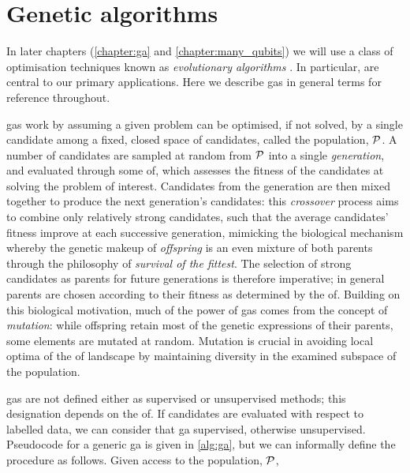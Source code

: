 \section{Genetic algorithms}\label{sec:genetic_algorithms}
In later chapters (\cref{chapter:ga} and \cref{chapter:many_qubits}) 
    we will use a class of optimisation techniques known as
    \emph{evolutionary algorithms} \cite{back1996evolutionary, de2020evolutionary}.
In particular, \emph{} are central to our primary applications.
Here we describe \glspl{ga} in general terms for reference throughout. 
\par 
\glspl{ga} work by assuming a given problem can be optimised, if not solved, by a single candidate 
    among a fixed, closed space of candidates, called the population, $\mathcal{P}$. 
A number of candidates are sampled at random from $\mathcal{P}$ into a single \emph{generation}, 
    and evaluated through some \acrfull{of}, which assesses the fitness of the candidates at solving the problem of interest. 
Candidates from the generation are then mixed together to produce the next generation's candidates: 
    this \emph{crossover} process aims to combine only relatively strong candidates, such that the average 
    candidates' fitness improve at each successive generation, 
    mimicking the biological mechanism whereby the genetic makeup of \emph{offspring} is an even mixture of both parents
    through the philosophy of \emph{survival of the fittest}. 
The selection of strong candidates as parents for future generations is therefore imperative; 
    in general parents are chosen according to their fitness as determined by the \gls{of}. 
Building on this biological motivation, much of the power of \glspl{ga} comes from the concept of \emph{mutation}: 
    while offspring retain most of the genetic expressions of their parents, some elements are mutated at random.
Mutation is crucial in avoiding local optima of the \gls{of} landscape
    by maintaining diversity in the examined subspace of the population.
\par 

\glspl{ga} are not defined either as supervised or unsupervised methods;
    this designation depends on the \gls{of}. 
If candidates are evaluated with respect to labelled data, we can consider that \gls{ga} supervised, 
    otherwise unsupervised. 
Pseudocode for a generic \gls{ga} is given in \cref{alg:ga},
    but we can informally define the procedure as follows. 
Given access to the population, $\mathcal{P}$, 

